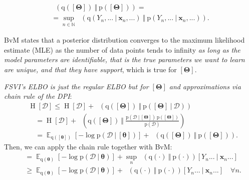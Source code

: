\documentclass[25pt,a0paper,landscape]{tikzposter}
\DeclareMathOperator{\opExpectation}{\mathbb{E}}
\newcommand{\E}[2]{\opExpectation_{#1} \left [ #2 \right ]}
\newcommand{\MidSymbol}[1][]{\:#1\:}
\newcommand{\given}{\MidSymbol[\vert]}
\DeclareMathOperator{\opEntropy}{H}
\newcommand{\Hof}[1]{\opEntropy[#1]}
\DeclareMathOperator{\opKale}{D_\mathrm{KL}}
\newcommand{\Kale}[2]{\opKale(#1 \MidSymbol[\Vert] #2)}
\newcommand{\opp}{\mathrm{p}}
\newcommand{\pof}[1]{\opp(#1)}
\newcommand{\opq}{\mathrm{q}}
\newcommand{\qof}[1]{\opq(#1)}
\newcommand{\w}{\boldsymbol{\theta}}
\newcommand{\W}{\boldsymbol{\Theta}}
\newcommand{\Dany}{\mathcal{D}}
\newcommand{\Y}{Y}
\newcommand{\x}{\boldsymbol{x}}
\begin{document}
\begin{columns}
{\begin{multicols}{2}
\begin{proofbox}[title=Equality in the Infinite Data Limit]
      \begin{multline*}
      \Kale{\qof{[\W]}}{\pof{[\W]}} = \\
      = \sup_{n\in \mathbb{N}} \Kale{\qof{\Y_n,...\given\x_n,...}}{\pof{\Y_n,...\given\x_n,...}}.
      \end{multline*}
    \end{proofbox}
    \begin{theorybox}[title=Bernstein von Mises' Theorem]
      BvM states that a posterior distribution converges to the maximum likelihood estimate (MLE) as the number of data points tends to infinity \emph{as long as the model parameters are identifiable, that is the true parameters we want to learn are unique, and that they have support}, which is true for $[\W]$. 
    \end{theorybox}
    \begin{proofbox}[title=Function-Space Variational Inference \& ELBO]
      \emph{FSVI's ELBO is just the regular ELBO but for $[\W]$ and approximations via chain rule of the DPI}:
      \begin{align*}
        &\Hof{\Dany} \le \Hof{\Dany} + \Kale{\qof{[\W]}}{\pof{[\W] \given \Dany}} \\
        &\quad = \Hof{\Dany} + \Kale{\qof{[\W]}}{\frac{\pof{\Dany \given [\W]} \, \pof{[\W]}}{\pof{\Dany}}} \\
        &\quad = 
        \E{\qof{[\w]}}{-\log \pof{\Dany \given [\w]}} + \Kale{\qof{[\W]}}{\pof{[\W]}}.
      \end{align*}
      Then, we can apply the chain rule together with BvM:
      \begin{align*}
        & = \E{\qof{\w}}{-\log \pof{\Dany \given \w}}  + \sup_n \Kale{\qof{\cdot}}{\pof{\cdot}}[\Y_n... \given \x_n...] \\
        & \ge \E{\qof{\w}}{-\log \pof{\Dany \given \w}} + \Kale{\qof{\cdot}}{\pof{\cdot}}[\Y_n... \given \x_n...] \quad \forall n.
      \end{align*}
    \end{proofbox}
    \end{multicols}
}
\end{columns}

\end{document}
